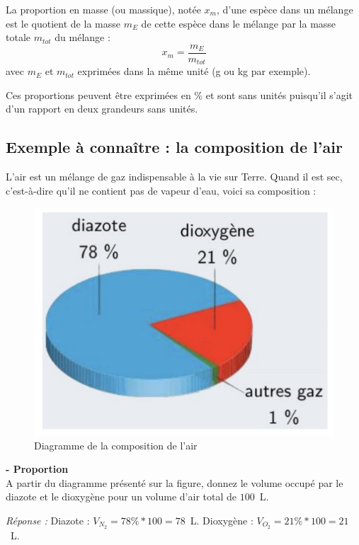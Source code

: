 \begin{tcolorbox}[colback=green!5!white,colframe=green!75!black,title=\textbf{Proportion massique}]
La proportion en masse (ou massique), notée $x_m$, d'une espèce dans un mélange est le quotient de la masse $m_{E}$ de cette espèce dans le mélange par la masse totale $m_{tot}$ du mélange :
\begin{equation*}
    x_m=\frac{m_E}{m_{tot}}
\end{equation*}
avec $m_{E}$ et $m_{tot}$ exprimées dans la même unité (g ou kg par exemple).
\end{tcolorbox}

Ces proportions peuvent être exprimées en \% et sont sans unités puisqu'il s'agit d'un rapport en deux grandeurs sans unités.

\subsection{Exemple à connaître : la composition de l'air}
L'air est un mélange de gaz indispensable à la vie sur Terre. Quand il est sec, c'est-à-dire qu'il ne contient pas de vapeur d'eau, voici sa composition :
\begin{figure}[!hbt]
    \centering
    \includegraphics[scale=0.5]{Images/Composition_air.png}
    \caption{Diagramme de la composition de l'air}
    \label{fig:compo_air}
\end{figure}

\begin{mdframed}[style=autreexo]
\textbf{ - Proportion}\\
A partir du diagramme présenté sur la figure, donnez le volume occupé par le diazote et le dioxygène pour un volume d'air total de $100$~L.
\end{mdframed}
\textit{Réponse :} Diazote : $V_{N_2}=78\%*100=78$~L. Dioxygène : $V_{O_2}=21\%*100=21$~L.

